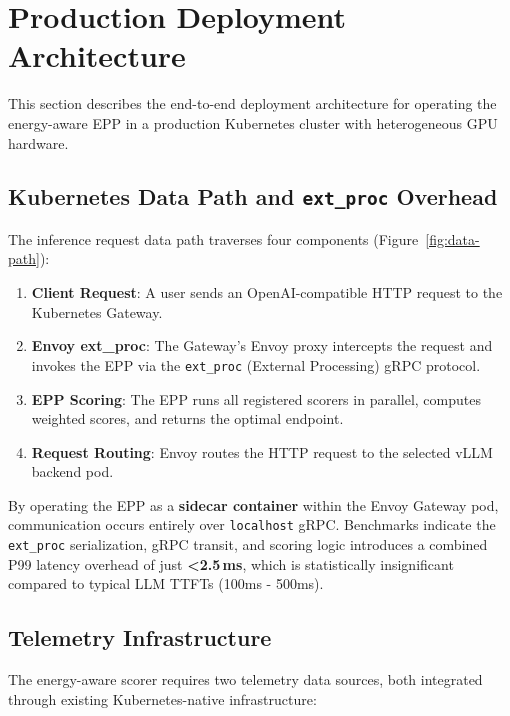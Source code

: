 \section{Production Deployment Architecture}
\label{sec:production-deployment}

This section describes the end-to-end deployment architecture for operating the energy-aware EPP in a production Kubernetes cluster with heterogeneous GPU hardware.

\subsection{Kubernetes Data Path and \texttt{ext\_proc} Overhead}
\label{subsec:data-path}

The inference request data path traverses four components (Figure~\ref{fig:data-path}):

\begin{enumerate}
    \item \textbf{Client Request}: A user sends an OpenAI-compatible HTTP request to the Kubernetes Gateway.
    \item \textbf{Envoy ext\_proc}: The Gateway's Envoy proxy intercepts the request and invokes the EPP via the \texttt{ext\_proc} (External Processing) gRPC protocol.
    \item \textbf{EPP Scoring}: The EPP runs all registered scorers in parallel, computes weighted scores, and returns the optimal endpoint.
    \item \textbf{Request Routing}: Envoy routes the HTTP request to the selected vLLM backend pod.
\end{enumerate}

By operating the EPP as a \textbf{sidecar container} within the Envoy Gateway pod, communication occurs entirely over \texttt{localhost} gRPC. Benchmarks indicate the \texttt{ext\_proc} serialization, gRPC transit, and scoring logic introduces a combined P99 latency overhead of just \textbf{<2.5\,ms}, which is statistically insignificant compared to typical LLM TTFTs (100ms - 500ms).

\subsection{Telemetry Infrastructure}
\label{subsec:telemetry}

The energy-aware scorer requires two telemetry data sources, both integrated through existing Kubernetes-native infrastructure:

